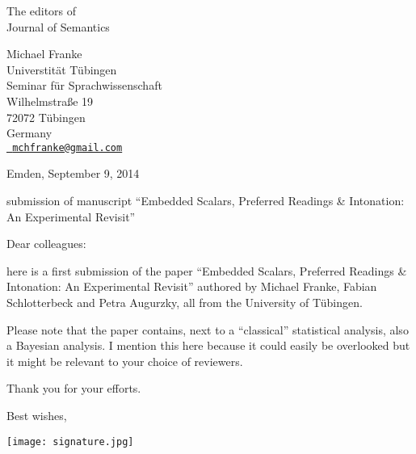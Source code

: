 \documentclass[fleqn,reqno,10pt]{article}
\begin{document}
\thispagestyle{empty}

\begin{minipage}{7.5cm}
  The editors of\\
  Journal of Semantics
\end{minipage}\hfill
\begin{minipage}{5.3cm}
  Michael Franke \\
  Universtit\"at T\"ubingen \\
  Seminar f\"ur Sprachwissenschaft \\
  Wilhelmstra\ss e 19\\
  72072 T\"ubingen\\
  Germany  \\
  \medskip \href{mailto:mchfranke@gmail.com}{\tt
    mchfranke@gmail.com}
\end{minipage}


\vspace{0.75cm}

\hfill Emden, September 9, 2014

\vspace{0.75cm}

submission of manuscript ``Embedded Scalars, Preferred Readings \& Intonation: An
  Experimental Revisit''

\vspace{0.75cm}

Dear colleagues:

\bigskip

here is a first submission of the paper ``Embedded Scalars, Preferred
Readings \& Intonation: An Experimental Revisit'' authored by Michael
Franke, Fabian Schlotterbeck and Petra Augurzky, all from the
University of T\"ubingen.

Please note that the paper contains, next to a ``classical''
statistical analysis, also a Bayesian analysis. I mention this here
because it could easily be overlooked but it might be relevant to your
choice of reviewers.

Thank you for your efforts.


\vspace{0.75cm}

\hfill Best wishes,\hspace{2.5cm}

\medskip

\hfill \texttt{[image: signature.jpg]}\hspace{1.7cm}

\vspace{-.3cm}


\end{document}

